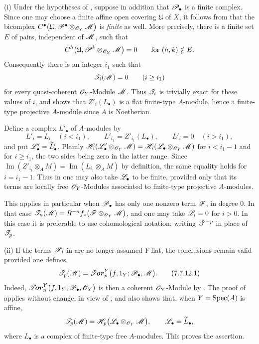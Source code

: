 \begin{remarks}[7.7.12]
\label{III.7.7.12}
\textnormal{(i)}
Under the hypotheses of , suppose in
addition that $\mathscr{P}_\bullet$ is a finite complex.  Since
one may choose a finite affine open covering $\mathfrak U$
of $X$, it follows from  that the
bicomplex $C^\bullet
\bigl(
\mathfrak U,
\mathscr{P}^\bullet\otimes_{\mathscr{O}_Y}\mathscr{M}
\bigr)$
is \emph{finite} as well.  More precisely, there is a finite set
$E$ of pairs, independent of $\mathscr{M}$, such that
\[
  C^h
  \bigl(
    \mathfrak U,
    \mathscr{P}^k\otimes_{\mathscr{O}_Y}\mathscr{M}
  \bigr)
  =0
  \qquad\text{for }(h,k)\notin E.
\]
Consequently there is an integer $i_1$ such that
\[
  \mathscr{T}_i(\mathscr{M})=0
  \qquad(i\geq i_1)
\]
for every quasi-coherent $\mathscr{O}_Y$-Module $\mathscr{M}$.  Thus
$\mathscr{T}_i$ is trivially exact for these values of $i$, and
 shows that $Z'_i(L_\bullet)$ is a flat
finite-type $A$-module, hence a finite-type projective
$A$-module since $A$ is Noetherian.

Define a complex $L'_\bullet$ of $A$-modules by
\[
  L'_i=L_i\quad(i<i_1),
  \qquad
  L'_{i_1}=Z'_{i_1}(L_\bullet),
  \qquad
  L'_i=0\quad(i>i_1),
\]
and put $\mathscr{L}'_\bullet=\widetilde{L}'_\bullet$.  Plainly $\mathscr{H}_i
(\mathscr{L}'_\bullet\otimes_{\mathscr{O}_Y}\mathscr{M})
=
\mathscr{H}_i
(\mathscr{L}_\bullet\otimes_{\mathscr{O}_Y}\mathscr{M})$
for $i<i_1-1$ and for $i\geq i_1$, the two sides being zero
in the latter range.  Since $\operatorname{Im}
(Z'_{i_1}\otimes_A M)
=
\operatorname{Im}
(L_{i_1}\otimes_A M)$
by definition, the same equality holds for $i=i_1-1$.
Thus in  one may also take
$\mathscr{L}_\bullet$ to be finite, provided only that its terms
are locally free $\mathscr{O}_Y$-Modules associated to
finite-type projective $A$-modules.

This applies in particular when $\mathscr{P}_\bullet$ has only
one nonzero term $\mathscr{F}$, in degree $0$.  In that case $\mathscr{T}_n(\mathscr{M})
=
R^{-n}f_*
\bigl(\mathscr{F}\otimes_{\mathscr{O}_Y}\mathscr{M}\bigr)$,
and one may take $\mathscr{L}_i=0$ for $i>0$.  In this case it is
preferable to use cohomological notation, writing
$\mathscr{T}^{-p}$ in place of $\mathscr{T}_p$.

\medskip
\textnormal{(ii)}
If the terms $\mathscr{P}_i$ in  are no longer
assumed $Y$-flat, the conclusions remain valid provided one
defines
\[
  \mathscr{T}_p(\mathscr{M})
  =
  \boldsymbol{\mathscr{T}\!\mathit{or}}^Y_p
  \bigl(f,1_Y;\mathscr{P}_\bullet,\mathscr{M}\bigr).
  \tag{7.7.12.1}\label{III.7.7.12.1}
\]
Indeed, $\boldsymbol{\mathscr{T}\!\mathit{or}}^Y_n
\bigl(f,1_Y;\mathscr{P}_\bullet,\mathscr{O}_Y\bigr)$
is then a coherent $\mathscr{O}_Y$-Module by
.  The proof of  applies
without change, in view of , and also shows
that, when $Y=\operatorname{Spec}(A)$ is affine,
\[
  \mathscr{T}_p(\mathscr{M})
  =
  \mathscr{H}_p
  \bigl(
    \mathscr{L}_\bullet\otimes_{\mathscr{O}_Y}\mathscr{M}
  \bigr),
  \qquad
  \mathscr{L}_\bullet=\widetilde{L}_\bullet,
\]
where $L_\bullet$ is a complex of finite-type free
$A$-modules.  This proves the assertion.
\end{remarks}
